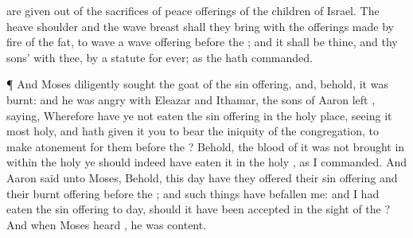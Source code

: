 {{} are
given out of the
sacrifices of peace
offerings of the
children of
Israel.
The
heave
shoulder and the
wave
breast shall they
bring with the offerings made by
fire of the
fat, to
wave
{} a wave
offering
before the
{}; and it shall be thine, and thy
sons’ with thee, by a
statute for
ever; as the
{} hath
commanded.
\par }{\PP {}¶ And
Moses
diligently
sought the
goat of the sin
offering, and, behold, it was
burnt: and he was
angry with
Eleazar and
Ithamar, the
sons of
Aaron
{}
left
{},
saying,
Wherefore have ye not
eaten the sin
offering in the
holy
place, seeing it
{}
most
holy, and
{} hath
given it you to
bear the
iniquity of the
congregation, to make
atonement for them
before the
{}?
Behold, the
blood of it was not
brought in
within the
holy
{} ye should
indeed have
eaten it in the
holy
{}, as I
commanded.
And
Aaron
said unto
Moses, Behold, this
day have they
offered their sin
offering and their burnt
offering
before the
{}; and such things have
befallen me: and
{} I had
eaten the sin
offering to
day, should it have been
accepted in the
sight of the
{}?
And when
Moses
heard
{}, he was
content.

}
